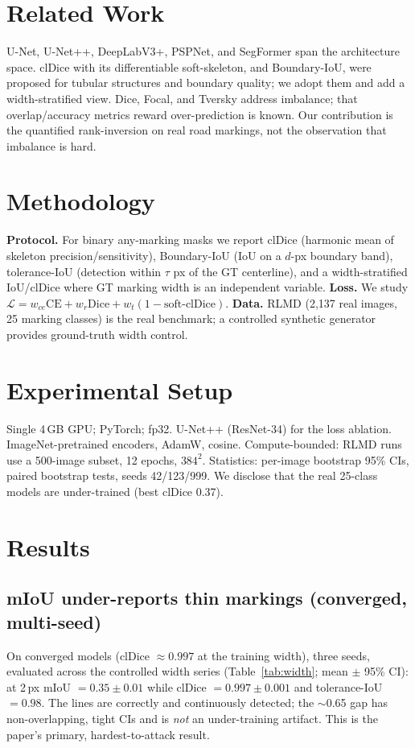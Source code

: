 \documentclass[10pt,twocolumn]{article}
\begin{document}
\section{Related Work}
U-Net, U-Net++, DeepLabV3+, PSPNet, and SegFormer span the architecture space.
clDice with its differentiable soft-skeleton, and Boundary-IoU, were proposed for
tubular structures and boundary quality; we adopt them and add a width-stratified
view. Dice, Focal, and Tversky address imbalance; that overlap/accuracy metrics
reward over-prediction is known. Our contribution is the quantified rank-inversion
on real road markings, not the observation that imbalance is hard.

\section{Methodology}
\textbf{Protocol.} For binary any-marking masks we report clDice (harmonic mean of
skeleton precision/sensitivity), Boundary-IoU (IoU on a $d$-px boundary band),
tolerance-IoU (detection within $\tau$ px of the GT centerline), and a
width-stratified IoU/clDice where GT marking width is an independent variable.
\textbf{Loss.} We study $\mathcal{L}=w_{ce}\mathrm{CE}+w_r\mathrm{Dice}+
w_t(1-\text{soft-clDice})$. \textbf{Data.} RLMD (2{,}137 real images, 25 marking
classes) is the real benchmark; a controlled synthetic generator provides
ground-truth width control.

\section{Experimental Setup}
Single 4\,GB GPU; PyTorch; fp32. U-Net++ (ResNet-34) for the loss ablation.
ImageNet-pretrained encoders, AdamW, cosine. Compute-bounded: RLMD runs use a
500-image subset, 12 epochs, $384^2$. Statistics: per-image bootstrap 95\% CIs,
paired bootstrap tests, seeds 42/123/999. We disclose that the real 25-class
models are under-trained (best clDice 0.37).

\section{Results}
\subsection{mIoU under-reports thin markings (converged, multi-seed)}
On converged models (clDice $\approx0.997$ at the training width), three seeds,
evaluated across the controlled width series (Table~\ref{tab:width}; mean $\pm$
95\% CI): at 2\,px mIoU $=0.35\pm0.01$ while clDice $=0.997\pm0.001$ and
tolerance-IoU $=0.98$. The lines are correctly and continuously detected; the
$\sim$0.65 gap has non-overlapping, tight CIs and is \emph{not} an under-training
artifact. This is the paper's primary, hardest-to-attack result.
\end{document}
